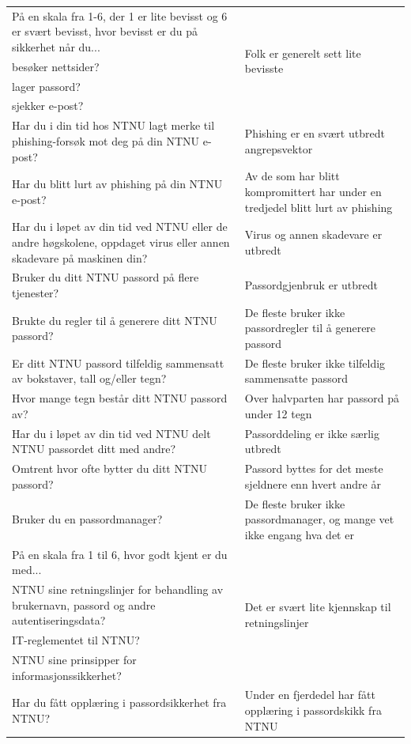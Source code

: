 \begin{table}[H]
\begin{tabular}{|p{20.215em}|p{20.57em}|}
    \hline
    På en skala fra 1-6, der 1 er lite bevisst og 6 er svært bevisst, hvor bevisst er du på sikkerhet når du... & \multirow{4}[2]{*}{Folk er generelt sett lite bevisste} \\
    besøker nettsider? & \multicolumn{1}{r|}{} \\
    lager passord? & \multicolumn{1}{r|}{} \\
    sjekker e-post? & \multicolumn{1}{r|}{} \\
    \hline
    Har du i din tid hos NTNU lagt merke til phishing-forsøk mot deg på din NTNU e-post? & Phishing er en svært utbredt angrepsvektor \\
    \hline
    Har du blitt lurt av phishing på din NTNU e-post? & Av de som har blitt kompromittert har under en tredjedel blitt lurt av phishing \\
    \hline
    Har du i løpet av din tid ved NTNU eller de andre høgskolene, oppdaget virus eller annen skadevare på maskinen din? & Virus og annen skadevare er utbredt \\
    \hline
    Bruker du ditt NTNU passord på flere tjenester? & Passordgjenbruk er utbredt \\
    \hline
    Brukte du regler til å generere ditt NTNU passord? & De fleste bruker ikke passordregler til å generere passord \\
    \hline
    Er ditt NTNU passord tilfeldig sammensatt av bokstaver, tall og/eller tegn? & De fleste bruker ikke tilfeldig sammensatte passord \\
    \hline
    Hvor mange tegn består ditt NTNU passord av? & Over halvparten har passord på under 12 tegn \\
    \hline
    Har du i løpet av din tid ved NTNU delt NTNU passordet ditt med andre? & Passorddeling er ikke særlig utbredt \\
    \hline
    Omtrent hvor ofte bytter du ditt NTNU passord? & Passord byttes for det meste sjeldnere enn hvert andre år \\
    \hline
    Bruker du en passordmanager? & De fleste bruker ikke passordmanager, og mange vet ikke engang hva det er \\
    \hline
    På en skala fra 1 til 6, hvor godt kjent er du med... & \multirow{4}[2]{*}{Det er svært lite kjennskap til retningslinjer} \\
    NTNU sine retningslinjer for behandling av brukernavn, passord og andre autentiseringsdata? & \multicolumn{1}{r|}{} \\
    IT-reglementet til NTNU? & \multicolumn{1}{r|}{} \\
    NTNU sine prinsipper for informasjonssikkerhet? & \multicolumn{1}{r|}{} \\
    \hline
    Har du fått opplæring i passordsikkerhet fra NTNU? & Under en fjerdedel har fått opplæring i passordskikk fra NTNU \\
    \hline
    \end{tabular}%
  \label{tab:case2-hypoteser}%
\end{table}%

